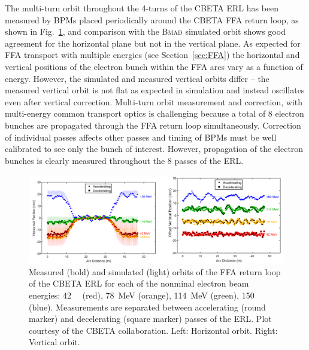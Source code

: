 \documentclass[../main.tex]{subfiles}
\begin{document}
The multi-turn orbit throughout the 4-turns of the CBETA ERL has been measured by BPMs placed periodically around the CBETA FFA return loop, as shown in Fig.~\ref{fig:CBETA_horizontal_vertical_orbit}, and comparison with the \textsc{Bmad} \cite{BmadManual} simulated orbit shows good agreement for the horizontal plane but not in the vertical plane. As expected for FFA transport with multiple energies (see Section~\ref{sec:FFA}) the horizontal and vertical positions of the electron bunch within the FFA arcs vary as a function of energy. However, the simulated and measured vertical orbits differ -- the measured vertical orbit is not flat as expected in simulation and instead oscillates even after vertical correction. Multi-turn orbit measurement and correction, with multi-energy common transport optics is challenging because a total of 8 electron bunches are propagated through the FFA return loop simultaneously. Correction of individual passes affects other passes and timing of BPMs must be well calibrated to see only the bunch of interest. However, propagation of the electron bunches is clearly measured throughout the 8 passes of the ERL.
\begin{figure}[!h]
\centering
\includegraphics[width=\textwidth]{Figures/CBETA_Multi-Pass_Commissioning/horizontal_vertical_orbit.pdf}
\caption{Measured (bold) and simulated (light) orbits of the FFA return loop of the CBETA ERL for each of the nonminal electron beam energies: 42~\si{\mega\electonvolt} (red), 78~\si{\mega\electronvolt} (orange), 114~\si{\mega\electronvolt} (green), 150~\si{\mega\electonvolt} (blue). Measurements are separated between accelerating (round marker) and decelerating (square marker) passes of the ERL. Plot courtesy of the CBETA collaboration. Left: Horizontal orbit. Right: Vertical orbit.}
\label{fig:CBETA_horizontal_vertical_orbit}
\end{figure}
\end{document}
